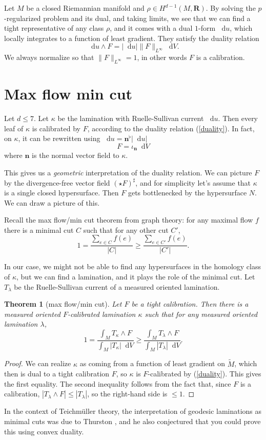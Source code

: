 \documentclass[reqno,11pt]{amsart}
\newcommand{\RR}{\mathbf{R}}
\newcommand*\dif{\mathop{}\!\mathrm{d}}
\newcommand{\normal}{\mathbf n}
\newtheorem{theorem}{Theorem}[section]
\theoremstyle{definition}
\numberwithin{equation}{section}
\begin{document}
Let $M$ be a closed Riemannian manifold and $\rho \in H^{d - 1}(M, \RR)$.
By solving the $p$-regularized problem and its dual, and taking limits, we see that we can find a tight representative of any class $\rho$, and it comes with a dual $1$-form $\dif u$, which locally integrates to a function of least gradient.
They satisfy the duality relation 
\begin{equation}\label{duality}
\dif u \wedge F = |\dif u| \|F\|_{L^\infty} \dif V.
\end{equation}
We always normalize so that $\|F\|_{L^\infty} = 1$, in other words $F$ is a calibration.

\section{Max flow min cut}
Let $d \leq 7$.
Let $\kappa$ be the lamination with Ruelle-Sullivan current $\dif u$.
Then every leaf of $\kappa$ is calibrated by $F$, according to the duality relation (\ref{duality}).
In fact, on $\kappa$, it can be rewritten using $\dif u = \normal^\flat |\dif u|$
$$F = \iota_\normal \dif V$$
where $\normal$ is the normal vector field to $\kappa$.

This gives us a \emph{geometric} interpretation of the duality relation.
We can picture $F$ by the divergence-free vector field $(\star F)^\sharp$, and for simplicity let's assume that $\kappa$ is a single closed hypersurface.
Then $F$ gets bottlenecked by the hypersurface $N$.
We can draw a picture of this.

Recall the max flow/min cut theorem from graph theory: for any maximal flow $f$ there is a minimal cut $C$ such that for any other cut $C'$,
$$1 = \frac{\sum_{e \in C} f(e)}{|C|} \geq \frac{\sum_{e \in C'} f(e)}{|C'|}.$$

In our case, we might not be able to find any hypersurfaces in the homology class of $\kappa$, but we can find a lamination, and it plays the role of the minimal cut.
Let $T_\lambda$ be the Ruelle-Sullivan current of a measured oriented lamination.

\begin{theorem}[max flow/min cut]
Let $F$ be a tight calibration.
Then there is a measured oriented $F$-calibrated lamination $\kappa$ such that for any measured oriented lamination $\lambda$,
$$1 = \frac{\int_M T_\kappa \wedge F}{\int_M |T_\kappa| \dif V} \geq \frac{\int_M T_\lambda \wedge F}{\int_M |T_\lambda| \dif V}.$$
\end{theorem}
\begin{proof}
We can realize $\kappa$ as coming from a function of least gradient on $\tilde M$, which then is dual to a tight calibration $F$, so $\kappa$ is $F$-calibrated by (\ref{duality}).
This gives the first equality.
The second inequality follows from the fact that, since $F$ is a calibration, $|T_\lambda \wedge F| \leq |T_\lambda|$, so the right-hand side is $\leq 1$.
\end{proof}

In the context of Teichm\"uller theory, the interpretation of geodesic laminations as minimal cuts was due to Thurston \cite{Thurston98}, and he also conjectured that you could prove this using convex duality.




\printbibliography
\end{document}
